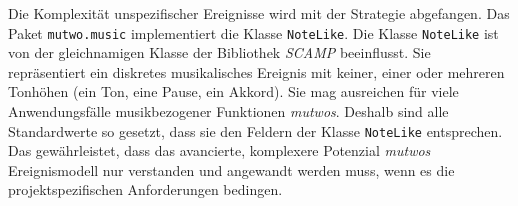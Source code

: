 \documentclass[12pt,a4paper,ngerman]{article}
\begin{document}
\hspace{-0.4cm}

\vspace{0.75cm}

Die Komplexität unspezifischer Ereignisse wird mit der Strategie  abgefangen.
Das Paket \texttt{mutwo.music} implementiert die Klasse \texttt{NoteLike}.
Die Klasse \texttt{NoteLike} ist von der gleichnamigen Klasse der Bibliothek \emph{SCAMP} beeinflusst.
Sie repräsentiert ein diskretes musikalisches Ereignis mit keiner, einer oder mehreren Tonhöhen (ein Ton, eine Pause, ein Akkord).
Sie mag ausreichen für viele Anwendungsfälle musikbezogener Funktionen \emph{mutwos}.
Deshalb sind alle Standardwerte so gesetzt, dass sie den Feldern der Klasse \texttt{NoteLike} entsprechen.
Das gewährleistet, dass das avancierte, komplexere Potenzial \emph{mutwos} Ereignismodell nur verstanden und angewandt werden muss, wenn es die projektspezifischen Anforderungen bedingen.


%
\end{document}
